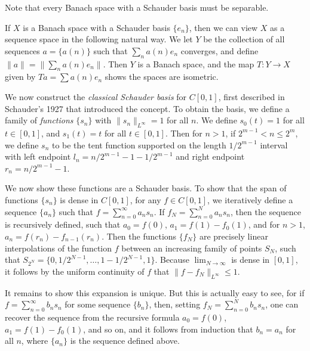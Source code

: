 \begin{remark}
    Note that every Banach space with a Schauder basis must be separable.
\end{remark}

If $X$ is a Banach space with a Schauder basis $\{ e_n \}$, then we can view $X$ as a sequence space in the following natural way. We let $Y$ be the collection of all sequences $a = \{ a(n) \}$ such that $\sum_n a(n) e_n$ converges, and define $\| a \| = \| \sum_n a(n) e_n \|$. Then $Y$ is a Banach space, and the map $T: Y \to X$ given by $Ta = \sum a(n) e_n$ shows the spaces are isometric.

\begin{example}
    We now construct the \emph{classical Schauder basis} for $C[0,1]$, first described in Schauder's 1927 that introduced the concept. To obtain the basis, we define a family of \emph{functions} $\{ s_n \}$ with $\| s_n \|_{L^\infty} = 1$ for all $n$. We define $s_0(t) = 1$ for all $t \in [0,1]$, and $s_1(t) = t$ for all $t \in [0,1]$. Then for $n > 1$, if $2^{m-1} < n \leq 2^m$, we define $s_n$ to be the tent function supported on the length $1/2^{m-1}$ interval with left endpoint $l_n = n/2^{m-1} - 1 - 1/2^{m-1}$ and right endpoint $r_n = n/2^{m-1} - 1$.

    We now show these functions are a Schauder basis. To show that the span of functions $\{ s_n \}$ is dense in $C[0,1]$, for any $f \in C[0,1]$, we iteratively define a sequence $\{ a_n \}$ such that $f = \sum_{n = 0}^\infty a_n s_n$. If $f_N = \sum_{n = 0}^N a_n s_n$, then the sequence is recursively defined, such that $a_0 = f(0)$, $a_1 = f(1) - f_0(1)$, and for $n > 1$, $a_n = f(r_n) - f_{n-1}(r_n)$. Then the functions $\{ f_N \}$ are precisely linear interpolations of the function $f$ between an increasing family of points $S_N$, such that $S_{2^N} = \{ 0, 1/2^{N-1}, \dots, 1 - 1/2^{N-1}, 1 \}$. Because $\lim_{N \to \infty}$ is dense in $[0,1]$, it follows by the uniform continuity of $f$ that $\| f - f_N \|_{L^\infty} \leq 1$.

    It remains to show this expansion is unique. But this is actually easy to see, for if $f = \sum_{n = 0}^\infty b_n s_n$ for some sequence $\{ b_n \}$, then, setting $f_N = \sum_{n = 0}^N b_n s_n$, one can recover the sequence from the recursive formula $a_0 = f(0)$, $a_1 = f(1) - f_0(1)$, and so on, and it follows from induction that $b_n = a_n$ for all $n$, where $\{ a_n \}$ is the sequence defined above.
\end{example}

